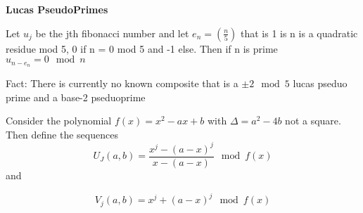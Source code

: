 \documentclass{article}
\begin{document}












\textbf{Lucas PseudoPrimes}

Let $u_j$ be the jth fibonacci number and let $e_n = (\frac{n}{5})$ that is 1 is n is a quadratic residue mod 5, 0 if n = 0 mod 5 and -1 else. Then if n is prime $u_{n-e_n} = 0 \mod n$

Fact: There is currently no known composite that is a $\pm 2 \mod 5$ lucas pseduo prime and a base-2 pseduoprime


Consider the polynomial $f(x) = x^2 - ax + b$ with $\Delta = a^2 - 4b$ not a square. Then define the sequences
$$ U_J (a,b) = \frac{x^j - (a - x)^j}{x - (a -x)} \mod f(x) $$ and 

$$ V_j (a,b) = x^j + (a - x)^j \mod f(x) $$
\end{document}
